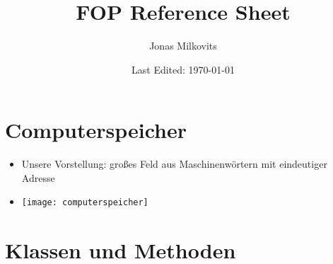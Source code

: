 


\renewcommand{\arraystretch}{1.25} 

\begin{titlepage}
  \title{FOP Reference Sheet} %
  \author{Jonas Milkovits}
  \date{Last Edited: \today}
\end{titlepage}



\maketitle
{} %
\tableofcontents
\clearpage
{} %

\section{Computerspeicher}
\begin{itemize}
\item Unsere Vorstellung: großes Feld aus Maschinenwörtern mit eindeutiger Adresse

\item[] \begin{center}
		\texttt{[image: computerspeicher]}
		\end{center}

\end{itemize}

\section{Klassen und Methoden}

\begin{tabular}{ | p{4cm} p{11.5cm} p{1.5cm} | }
\hline
&&\\ \hline






\end{tabular}



